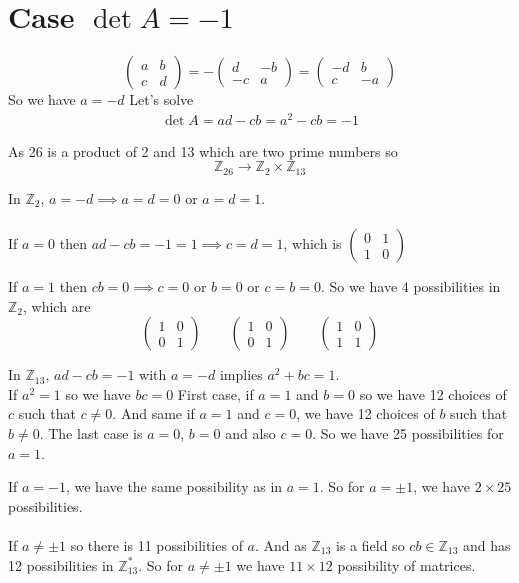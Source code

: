\documentclass[12pt,a4paper]{article}
\newcommand{\Z}{\mathbb{Z}}
\begin{document}
\section*{Case $\det A=-1$}

\[\begin{pmatrix}
	a&b\\c&d
\end{pmatrix}=-\begin{pmatrix}
	d&-b\\-c&a
\end{pmatrix}=\begin{pmatrix}
-d&b\\c&-a
\end{pmatrix}\]
So we have $a=-d$
Let's solve \begin{align}
	\det A=ad-cb=a^2-cb=-1 \label{eq 2}
\end{align}

As 26 is a product of 2 and 13 which are two prime numbers so 
\[\Z_{26}\to\Z_{2}\times\Z_{13}\]

In $\Z_{2}$, $a=-d\implies a=d=0$ or $a=d=1$.\\\\ If $a=0$ then $ad-cb=-1=1\implies c=d=1$, which is $\begin{pmatrix}0&1\\1&0 \end{pmatrix}$

 If $a=1$ then $cb=0\implies c=0$ or $b=0$ or $c=b=0$. So we have 4 possibilities in $\Z_{2}$, which are
 \[\begin{pmatrix}
 	1&0\\0&1
 \end{pmatrix}\qquad\begin{pmatrix}
 	1&0\\0&1
 \end{pmatrix}\qquad\begin{pmatrix}
 	1&0\\1&1
 \end{pmatrix}\]

In $\Z_{13}$, $ad-cb=-1$ with $a=-d$ implies $a^2+bc=1$.\\

If $a^2=1$ so we have $bc=0$
First case, if $a=1$ and $b=0$ so we have 12 choices of $c$ such that $c\neq 0$. And same if $a=1$ and $c=0$, we have 12 choices of $b$ such that $b\neq 0$. The last case is $a=0$, $b=0$ and also $c=0$. So we have 25 possibilities for $a=1$.

If $a=-1$, we have the same possibility as in $a=1$. 
So for $a=\pm 1$, we have $2\times 25$ possibilities.\\\\     
If $a\neq\pm 1$ so there is 11 possibilities of $a$. And as $\Z_{13}$ is a field so $cb\in\Z_{13}$ and has 12 possibilities in $\Z_{13}^*$. So for $a\neq\pm 1$ we have $11\times 12$ possibility of matrices. 
\end{document}

